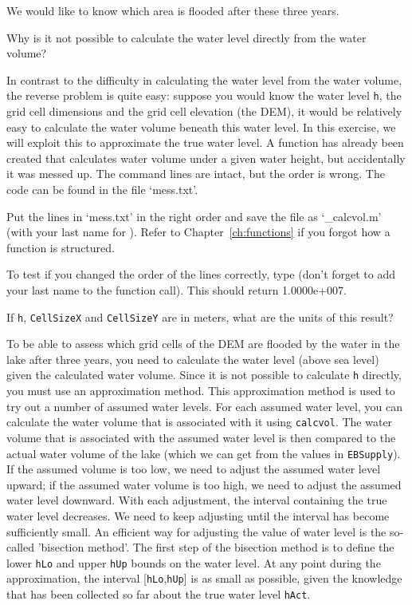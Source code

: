 We would like to know which area is flooded after these three years.
\begin{action}
Why is it not possible to calculate the water level directly from the water volume?
\end{action}
In contrast to the difficulty in calculating the water level from the water volume, the reverse problem is quite easy: suppose you would know the water level {\tt h}, the grid cell dimensions and the grid cell elevation (the DEM), it would be relatively easy to calculate the water volume beneath this water level. In this exercise, we will exploit this to approximate the true water level. A function has already been created that calculates water volume under a given water height, but accidentally it was messed up. The command lines are intact, but the order is wrong. The code can be found in the file `mess.txt'.
\begin{action}
Put the lines in `mess.txt' in the right order and save the file as `\_calcvol.m' (with your last name for ). Refer to Chapter~\ref{ch:functions} if you forgot how a function is structured.
\end{action}
\begin{action}
To test if you changed the order of the lines correctly, type
(don't forget to add your last name to the function call). This should return 1.0000e+007.
\end{action}
\begin{action}
If {\tt h}, {\tt CellSizeX} and {\tt CellSizeY} are in meters, what are the units of this result?
\end{action}
To be able to assess which grid cells of the DEM are flooded by the water in the lake after three years, you need to calculate the water level (above sea level) given the calculated water volume. Since it is not possible to calculate {\tt h} directly, you must use an approximation method. This approximation method is used to try out a number of assumed water levels. For each assumed water level, you can calculate the water volume that is associated with it using {\tt calcvol}. The water volume that is associated with the assumed water level is then compared to the actual water volume of the lake (which we can get from the values in {\tt EBSupply}). If the assumed volume is too low, we need to adjust the assumed water level upward; if the assumed water volume is too high, we need to adjust the assumed water level downward. With each adjustment, the interval containing the true water level decreases. We need to keep adjusting until the interval has become sufficiently small. An efficient way for adjusting the value of water level is the so-called 'bisection method'. The first step of the bisection method is to define the  lower {\tt hLo} and upper {\tt hUp} bounds on the water level. At any point during the approximation, the interval [{\tt hLo},{\tt hUp}] is as small as possible, given the knowledge that has been collected so far about the true water level {\tt hAct}.
